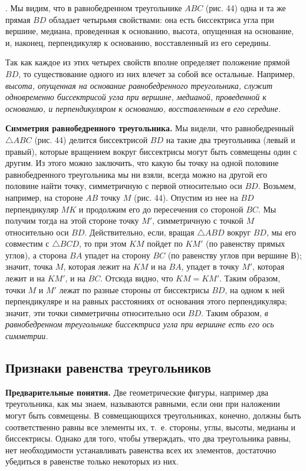 \documentclass[oneside]{book}
\begin{document}
.
Мы видим, что в равнобедренном треугольнике $ABC$ (рис. 44) одна и та же прямая $BD$ обладает четырьмя свойствами:
она есть биссектриса угла при вершине, медиана, проведенная к основанию, высота, опущенная на основание, и, наконец, перпендикуляр к основанию, восставленный из его середины.

Так как каждое из этих четырех свойств вполне определяет положение прямой $BD$, то существование одного из них влечет за собой все остальные.
Например, \emph{высота, опущенная на основание равнобедренного треугольника, служит одновременно биссектрисой угла при вершине, медианой, проведенной к основанию, и перпендикуляром к основанию, восставленным в его середине.}

\textbf{Симметрия равнобедренного треугольника.}
Мы видели, что равнобедренный $\triangle ABC$ (рис. 44) делится биссектрисой $BD$ на такие два треугольника (левый и правый), которые вращением вокруг биссектрисы могут быть совмещены один с другим.
Из этого можно заключить, что какую бы точку на одной половине равнобедренного треугольника мы ни взяли, всегда можно на другой его половине найти точку, симметричную с первой относительно оси $BD$.
Возьмем, например, на стороне $AB$ точку $M$ (рис. 44).
Опустим из нее на $BD$ перпендикуляр $MK$ и продолжим его до пересечения со стороной $BC$.
Мы получим тогда на этой стороне точку $M'$, симметричную с точкой $M$ относительно оси $BD$.
Действительно, если, вращая $\triangle ABD$ вокруг $BD$, мы его совместим с $\triangle BCD$, то при этом $KM$ пойдет по $KM'$ (по равенству прямых углов), а сторона $BA$ упадет на сторону $BC$ (по равенству углов при вершине В);
значит, точка $M$, которая лежит на $KM$ и на $BA$, упадет в точку $M'$, которая лежит и на $KM'$, и на $BC$.
Отсюда видно, что $KM=KM'$.
Таким образом, точки $M$ и $M'$ лежат по разные стороны от биссектрисы $BD$, на одном к ней перпендикуляре и на равных расстояниях от основания этого перпендикуляра;
значит, эти точки симметричны относительно оси $BD$.
Таким образом, \emph{в равнобедренном треугольнике биссектриса угла при вершине есть его ось симметрии.}

\subsection*{Признаки равенства треугольников}

\textbf{Предварительные понятия.}
Две геометрические фигуры, например два треугольника, как мы знаем, называются равными, если они при наложении могут быть совмещены.
В совмещающихся треугольниках, конечно, должны быть соответственно равны все элементы их, т.~е. стороны, углы, высоты, медианы и биссектрисы.
Однако для того, чтобы утверждать, что два треугольника равны, нет необходимости устанавливать равенства всех их элементов, достаточно убедиться в равенстве только некоторых из них.
\end{document}
